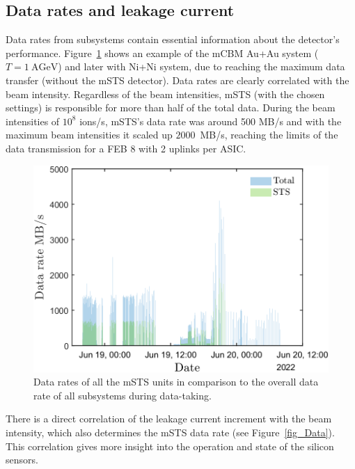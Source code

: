 \subsection{Data rates and leakage current}
Data rates from subsystems contain essential information about the detector's performance. Figure~\ref{fig_data_rates_Ag} shows an example of the \gls{mCBM} Au+Au system ($T= 1~\mathrm{AGeV}$) and later with Ni+Ni system, due to reaching the maximum data transfer (without the \gls{mSTS} detector). Data rates are clearly correlated with the beam intensity. Regardless of the beam intensities, \gls{mSTS} (with the chosen settings) is responsible for more than half of the total data. During the beam intensities of $10^{8}$ ions/s, \gls{mSTS}'s data rate was around 500 MB/s and with the maximum beam intensities it scaled up $2000$~MB/s, reaching the limits of the data transmission for a \gls{FEB} 8 with 2 uplinks per \gls{ASIC}. 
\begin{figure}[H]
\centering
\includegraphics[width=0.6\columnwidth]{Chapter6/DCS/images/rates/Ag_total.png}
\caption{Data rates of all the \gls{mSTS} units in comparison to the overall data rate of all subsystems during data-taking.}
\label{fig_data_rates_Ag}
\end{figure}
There is a direct correlation of the leakage current increment with the beam intensity, which also determines the \gls{mSTS} data rate (see Figure~\ref{fig_Data}). This correlation gives more insight into the operation and state of the silicon sensors.
